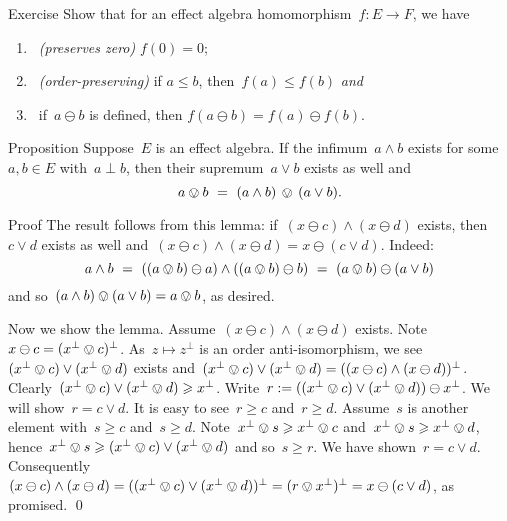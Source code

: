 \documentclass[b]{subfiles}
\begin{document}
\begin{parsec}
\begin{point}{Exercise}%
Show that for an effect algebra homomorphism~$f\colon E \to F$,
    we have
    \begin{enumerate}
        \item~\emph{(preserves zero)} $f(0) = 0$;
        \item~\emph{(order-preserving)} if $a \leq b$, then~$f(a) \leq f(b)$
                        \emph{and}
        \item~if~$a\ominus b$ is defined,
            then $f(a \ominus b) = f(a) \ominus f(b)$.
    \end{enumerate}
\end{point}
\end{parsec}

\begin{parsec}%
\begin{point}{Proposition}%
Suppose~$E$ is an effect algebra.
If the infimum~$a \wedge b$
    exists for some~$a,b \in E$ with~$a \perp b$,
    then their supremum~$a \vee b$ exists as well and
\begin{equation*}
    a \ovee b \ = \ (a \wedge b) \,\ovee\, (a \vee b).
\end{equation*}
\begin{point}{Proof}%
The result follows from this lemma:
    if~$(x \ominus c) \wedge (x \ominus d)$ exists,
    then~$c \vee d$ exists as well
    and~$(x \ominus c) \wedge (x \ominus d)
        = x \ominus (c \vee d)$.
Indeed:
\begin{equation*}
    a \wedge b \ = \ 
        ((a \ovee b) \ominus a) \wedge ((a \ovee b) \ominus b) \ = \ 
        (a \ovee b) \ominus (a \vee b)
\end{equation*}
    and so~$(a \wedge b) \ovee (a \vee b) = a \ovee b$, as desired.
\begin{point}%
Now we show the lemma.
Assume~$(x \ominus c) \wedge (x \ominus d)$ exists.
Note~$x \ominus c = (x^\perp \ovee c)^\perp$.
As~$z \mapsto z^\perp$ is an order anti-isomorphism,
    we see~$(x^\perp \ovee c) \vee (x^\perp \ovee d)$
        exists and~$(x^\perp \ovee c) \vee (x^\perp \ovee d)
                                    = ((x \ominus c)\wedge (x \ominus d))^\perp$.
Clearly~$ (x^\perp \ovee c) \vee
        (x^\perp \ovee d) \geq x^\perp$.
    Write~$r := ((x^\perp \ovee c) \vee
        (x^\perp \ovee d)) \ominus x^\perp$.
We will show~$r = c \vee d$.
It is easy to see~$r \geq c$ and~$r \geq d$.
Assume~$s$ is another element with~$s \geq c$ and~$s \geq d$.
Note~$x^\perp \ovee s \geq x^\perp \ovee c$
and~$x^\perp \ovee s \geq x^\perp \ovee d$,
    hence~$x^\perp \ovee s \geq (x^\perp \ovee c) \vee (x^\perp \ovee d)$
    and so~$ s \geq  r$.
We have shown~$r = c \vee d$.
Consequently~$ (x \ominus c)\wedge (x \ominus d)
        = ((x^\perp \ovee c) \vee (x^\perp \ovee d))^\perp
        = (r \ovee x^\perp)^\perp = 
            x \ominus (c \vee d) $, as promised. \qed
\end{point}    
\end{point}
\end{point}
\end{parsec}
\end{document}
